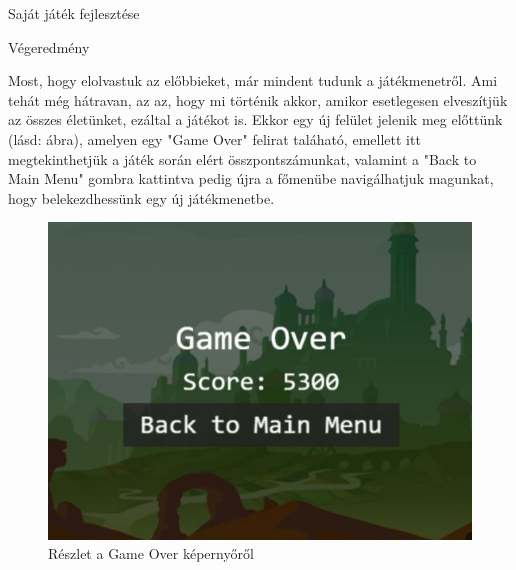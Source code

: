 \begin{MyChapter}{Saját játék fejlesztése}
\begin{MySection}{Végeredmény}
		
		Most, hogy elolvastuk az előbbieket, már mindent tudunk a játékmenetről. Ami tehát még hátravan, az az, hogy mi történik akkor, amikor esetlegesen elveszítjük az összes életünket, ezáltal a játékot is.
		Ekkor egy új felület jelenik meg előttünk (lásd:  ábra), amelyen egy "Game Over" felirat taláható, emellett itt megtekinthetjük a játék során elért összpontszámunkat, valamint a "Back to Main Menu" gombra kattintva pedig újra a főmenübe navigálhatjuk magunkat, hogy belekezdhessünk egy új játékmenetbe.
		
		\begin{figure}[h!]
			\centering
			\includegraphics[scale=0.65]{kepek/jatekHasznalat/game_over_scene}
			\caption{Részlet a Game Over képernyőről}
			\label{fig:jatekHasznalat:game_over_scene}
		\end{figure}
	
	\end{MySection}

\end{MyChapter}